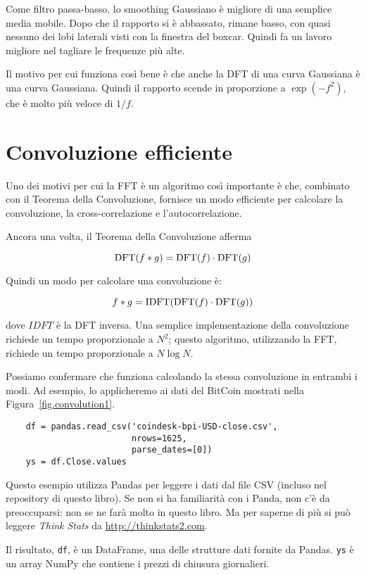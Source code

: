 \documentclass[12pt]{book} \usepackage[width=5.5in,height=8.5in, hmarginratio=3:2,vmarginratio=1:1]{geometry}
\begin{document}
Come filtro passa-basso, lo smoothing Gaussiano è migliore di una semplice media mobile. Dopo che il rapporto si è abbassato, rimane basso, con quasi nessuno dei lobi laterali visti con la finestra del boxcar. Quindi fa un lavoro migliore nel tagliare le frequenze più alte.

Il motivo per cui funziona così bene è che anche la DFT di una curva Gaussiana è una curva Gaussiana. Quindi il rapporto scende in proporzione a $\exp(-f^2)$, che è molto più veloce di $1/f$.

\section{Convoluzione efficiente} \label{effconv} 

Uno dei motivi per cui la FFT è un algoritmo così importante è che, combinato con il Teorema della Convoluzione, fornisce un modo efficiente per calcolare la convoluzione, la cross-correlazione e l'autocorrelazione.

Ancora una volta, il Teorema della Convoluzione afferma

%
\[ \mathrm{DFT}(f \ast g) = \mathrm{DFT}(f) \cdot \mathrm{DFT}(g) \] 

%
Quindi un modo per calcolare una convoluzione è:

%
\[ f \ast g = \mathrm{IDFT}(\mathrm{DFT}(f) \cdot \mathrm{DFT}(g)) \] 

%
dove $IDFT$ è la DFT inversa. Una semplice implementazione della convoluzione richiede un tempo proporzionale a $N^2$; questo algoritmo, utilizzando la FFT, richiede un tempo proporzionale a $N \log N$.

Possiamo confermare che funziona calcolando la stessa convoluzione in entrambi i modi. Ad esempio, lo applicheremo ai dati del BitCoin mostrati nella Figura~\ref{fig.convolution1}.

\begin{verbatim} 
    df = pandas.read_csv('coindesk-bpi-USD-close.csv',
                         nrows=1625,
                         parse_dates=[0])
    ys = df.Close.values
 \end{verbatim} 

Questo esempio utilizza Pandas per leggere i dati dal file CSV (incluso nel repository di questo libro). Se non si ha familiarità con i Panda, non c'è da preoccuparsi: non se ne farà molto in questo libro. Ma per saperne di più si può leggere {\it Think Stats} da \url{http://thinkstats2.com}.

Il risultato, {\tt df}, è un DataFrame, una delle strutture dati fornite da Pandas. {\tt ys} è un array NumPy che contiene i prezzi di chiusura giornalieri.
\end{document}
